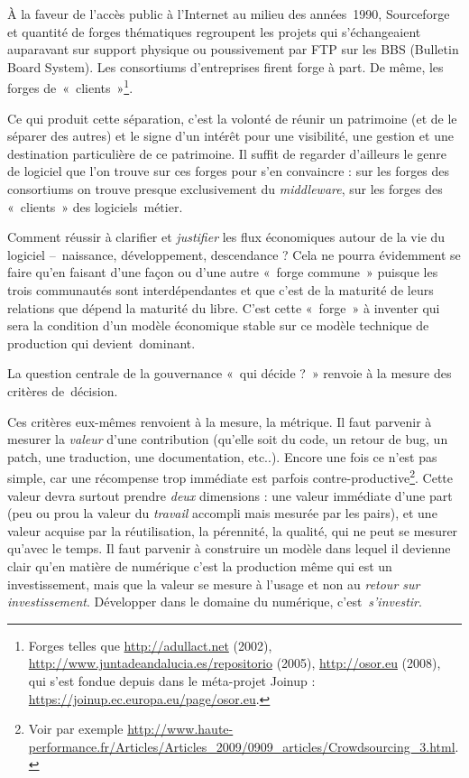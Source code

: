 \documentclass{FramateX}
\begin{document}
\begin{refsection}
À la faveur de l'accès public à l'Internet au milieu des années~1990,
Sourceforge et quantité de forges thématiques regroupent les projets
qui s'échangeaient auparavant sur support physique ou poussivement par
FTP sur les\textsc{ BBS} (Bulletin Board System). Les consortiums
d'entreprises firent forge à part. De même, les forges
de~«~clients~»\footnote{Forges telles que
\url{http://adullact.net} (2002), \url{http://www.juntadeandalucia.es/repositorio} (2005),
\url{http://osor.eu} (2008), qui s'est fondue depuis dans le méta-projet Joinup :
\url{https://joinup.ec.europa.eu/page/osor.eu}.}.

Ce qui produit cette séparation, c'est la volonté de réunir un
patrimoine (et de le séparer des autres) et le signe d'un intérêt pour
une visibilité, une gestion et une destination particulière de ce
patrimoine. Il suffit de regarder d'ailleurs le genre de logiciel que
l'on trouve sur ces forges pour s'en convaincre : sur les forges des
consortiums on trouve presque exclusivement du \textit{middleware}, sur
les forges des «~clients~» des logiciels~métier.

Comment réussir à clarifier et \textit{justifier} les flux économiques
autour de la vie du logiciel –~naissance, développement, descendance ?
Cela ne pourra évidemment se faire qu'en faisant d'une façon ou d'une
autre «~forge commune~» puisque les trois communautés sont
interdépendantes et que c'est de la maturité de leurs relations que
dépend la maturité du libre. C'est cette «~forge~» à inventer qui sera
la condition d'un modèle économique stable sur ce modèle technique de
production qui devient~dominant. 

La question centrale de la gouvernance «~qui décide ?~» renvoie à la
mesure des critères de~décision. 

Ces critères eux-mêmes renvoient à la mesure, la métrique. Il faut
parvenir à mesurer la \textit{valeur} d'une contribution (qu'elle soit
du code, un retour de bug, un patch, une traduction, une documentation,
etc..). Encore une fois ce n'est pas simple, car une récompense trop
immédiate est parfois contre-productive\footnote{Voir par exemple
\url{http://www.haute-performance.fr/Articles/Articles_2009/0909_articles/Crowdsourcing_3.html}.}.
Cette valeur devra surtout prendre \textit{deux} dimensions : une
valeur immédiate d'une part (peu ou prou la valeur du \textit{travail}
accompli mais mesurée par les pairs), et une valeur acquise par la
réutilisation, la pérennité, la qualité, qui ne peut se mesurer qu'avec
le temps. Il faut parvenir à construire un modèle dans lequel il
devienne clair qu'en matière de numérique c'est la production même qui
est un investissement, mais que la valeur se mesure à l'usage et non au
\textit{retour sur investissement}. Développer dans le domaine du
numérique, c'est~\textit{s'investir}.


\end{refsection}
\end{document}
